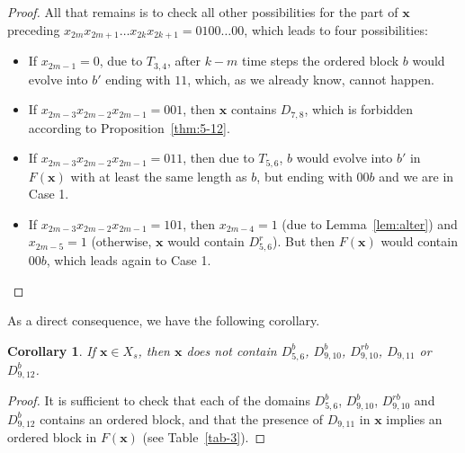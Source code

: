 \documentclass{sn-jnl}
\newtheorem{cor}{Corollary}%
\newcommand{\xconst}{X_{s}}
\newcommand{\bx}{\mathbf{x}}
\begin{document}
\begin{proof}
All that remains is to check all other possibilities for the part of $\bx$ preceding $x_{2m}x_{2m+1}\ldots x_{2k}x_{2k+1}=0100\ldots 00$, which leads to four possibilities:
\begin{itemize}\itemindent=15pt
    \item[Case 1:] If $x_{2m-1}=0$, due to $T_{3,4}$, after $k-m$ time steps the ordered block $b$ would evolve into $b'$ ending with $11$, which, as we already know, cannot happen.
    \item[Case 2:] If $x_{2m-3}x_{2m-2}x_{2m-1}=001$, then $\bx$ contains $D_{7,8}$, which is forbidden according to Proposition~\ref{thm:5-12}.
    \item[Case 3:] If $x_{2m-3}x_{2m-2}x_{2m-1}=011$, then due to $T_{5,6}$, $b$ would evolve into $b'$ in $F(\bx)$ with at least the same length as $b$, but ending with $00b$ and we are in Case 1.
    \item[Case 4:] If $x_{2m-3}x_{2m-2}x_{2m-1}=101$, then $x_{2m-4}=1$ (due to Lemma~\ref{lem:alter}) and $x_{2m-5}=1$ (otherwise, $\bx$ would contain $D_{5,6}^{r}$). But then $F(\bx)$ would contain $00b$, which leads again to Case 1.
\end{itemize}
\end{proof}

As a direct consequence, we have the following corollary.

\begin{cor}\label{cor:snakes}
If $\bx\in \xconst$, then $\bx$ does not contain $D_{5,6}^b$, $D_{9,10}^b$, $D_{9,10}^{rb}$, $D_{9,11}$ or $D_{9,12}^b$.
\end{cor}
\begin{proof}
It is sufficient to check that each of the domains $D_{5,6}^b$, $D_{9,10}^b$, $D_{9,10}^{rb}$ and $D_{9,12}^b$ contains an ordered block, and that the presence of $D_{9,11}$ in $\bx$ implies an ordered block in $F(\bx)$ (see Table~\ref{tab-3}).
\end{proof}
\end{document}
